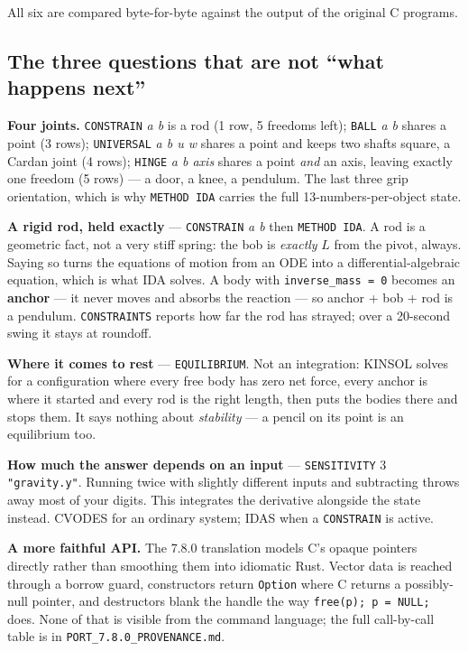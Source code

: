 \documentclass[11pt]{article}
\newcommand{\kw}[1]{\texttt{\uppercase{#1}}}
\newcommand{\code}[1]{\texttt{#1}}
\begin{document}
All six are compared byte-for-byte against the output of the original C
programs.

\subsection{The three questions that are not ``what happens next''}

\textbf{Four joints.} \kw{constrain} \emph{a b} is a rod (1 row, 5
freedoms left); \kw{ball} \emph{a b} shares a point (3 rows);
\kw{universal} \emph{a b u w} shares a point and keeps two shafts square,
a Cardan joint (4 rows); \kw{hinge} \emph{a b axis} shares a point
\emph{and} an axis, leaving exactly one freedom (5 rows) --- a door, a
knee, a pendulum. The last three grip orientation, which is why
\kw{method ida} carries the full 13-numbers-per-object state.

\textbf{A rigid rod, held exactly} --- \kw{constrain} \emph{a b} then
\kw{method ida}. A rod is a geometric fact, not a very stiff spring: the
bob is \emph{exactly} $L$ from the pivot, always. Saying so turns the
equations of motion from an ODE into a differential-algebraic equation,
which is what IDA solves. A body with \code{inverse\_mass = 0} becomes
an \textbf{anchor} --- it never moves and absorbs the reaction --- so
anchor + bob + rod is a pendulum. \kw{constraints} reports how far the
rod has strayed; over a 20-second swing it stays at roundoff.

\textbf{Where it comes to rest} --- \kw{equilibrium}. Not an
integration: KINSOL solves for a configuration where every free body has
zero net force, every anchor is where it started and every rod is the
right length, then puts the bodies there and stops them. It says nothing
about \emph{stability} --- a pencil on its point is an equilibrium too.

\textbf{How much the answer depends on an input} ---
\kw{sensitivity} 3 \code{"gravity.y"}. Running twice with slightly
different inputs and subtracting throws away most of your digits. This
integrates the derivative alongside the state instead. CVODES for an
ordinary system; IDAS when a \kw{constrain} is active.

\textbf{A more faithful API.} The 7.8.0 translation models C's opaque
pointers directly rather than smoothing them into idiomatic Rust. Vector
data is reached through a borrow guard, constructors return
\code{Option} where C returns a possibly-null pointer, and destructors
blank the handle the way \code{free(p); p = NULL;} does. None of that is
visible from the command language; the full call-by-call table is in
\code{PORT\_7.8.0\_PROVENANCE.md}.
\end{document}
